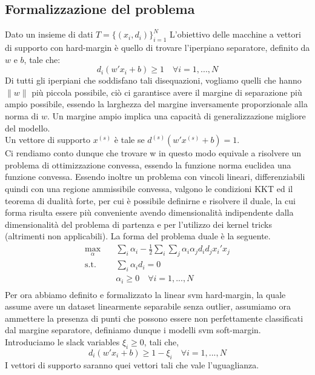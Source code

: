 \documentclass{article}
\begin{document}
\subsection{Formalizzazione del problema}
Dato un insieme di dati $T = \{(x_i, d_i)\}_{i=1}^N$ L'obiettivo delle macchine a vettori di supporto con hard-margin è quello di trovare l'iperpiano separatore, definito da $w$ e $b$, tale che:
\[d_i(w'x_i + b) \geq 1 \quad \forall i = 1, ..., N\]
Di tutti gli iperpiani che soddisfano tali disequazioni, vogliamo quelli che hanno $\| w \|$ più piccola possibile, ciò ci garantisce avere il margine di separazione più ampio possibile, essendo la larghezza del margine inversamente proporzionale alla norma di $w$. Un margine ampio implica una capacità di generalizzazione migliore del modello.\\
Un vettore di supporto $x^{(s)}$ è tale se $d^{(s)}(w'x^{(s)} +b) = 1$.\\
Ci rendiamo conto dunque che trovare w in questo modo equivale a risolvere un problema di ottimizzazione convessa, essendo la funzione norma euclidea una funzione convessa. Essendo inoltre un problema con vincoli lineari, differenziabili quindi con una regione ammissibile convessa, valgono le condizioni KKT ed il teorema di dualità forte, per cui è possibile definirne e risolvere il duale, la cui forma risulta essere più conveniente avendo dimensionalità indipendente dalla dimensionalità del problema di partenza e  per l'utilizzo dei kernel tricks (altrimenti non applicabili). La forma del problema duale è la seguente.
\begin{equation}
\begin{aligned}
\max_{\alpha} \quad & \sum_i \alpha_i - \frac{1}{2}\sum_i \sum_j \alpha_i \alpha_j d_i d_j x_i'x_j\\
\textrm{s.t.} \quad & \sum_i \alpha_i d_i = 0\\
  & \alpha_i \geq 0 \quad \forall i = 1, ..., N\\
\end{aligned}
\end{equation}
Per ora abbiamo definito e formalizzato la linear svm hard-margin, la quale assume avere un dataset linearmente separabile senza outlier, assumiamo ora ammettere la presenza di punti che possono essere non perfettamente classificati dal margine separatore, definiamo dunque i modelli svm soft-margin.\\
Introduciamo le slack variables $\xi_i \geq 0$, tali che,
\[d_i(w'x_i + b) \geq 1 - \xi_i \quad \forall i = 1, ..., N\]
I vettori di supporto saranno quei vettori tali che vale l'uguaglianza.\\
\end{document}
